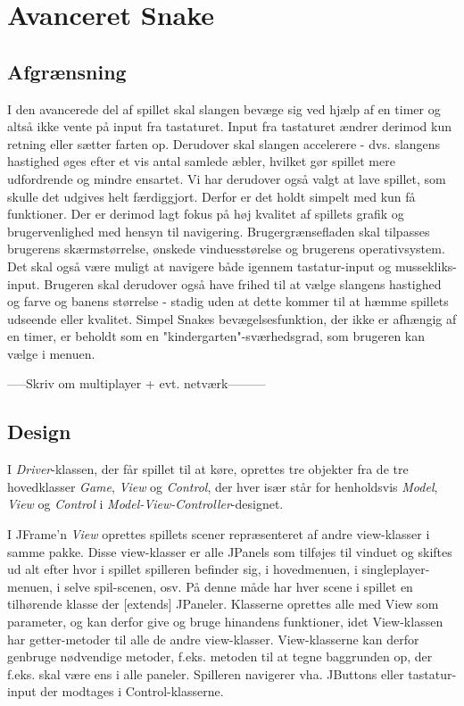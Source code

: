 \documentclass{report}
\begin{document}
\chapter{Avanceret Snake}
\section{Afgrænsning}
I den avancerede del af spillet skal slangen bevæge sig ved hjælp af en timer og altså ikke vente på input fra tastaturet. Input fra tastaturet ændrer derimod kun retning eller sætter farten op. Derudover skal slangen accelerere - dvs. slangens hastighed øges efter et vis antal samlede æbler, hvilket gør spillet mere udfordrende og mindre ensartet. Vi har derudover også valgt at lave spillet, som skulle det udgives helt færdiggjort. Derfor er det holdt simpelt med kun få funktioner. Der er derimod lagt fokus på høj kvalitet af spillets grafik og brugervenlighed med hensyn til navigering. Brugergrænsefladen skal tilpasses brugerens skærmstørrelse, ønskede vinduesstørelse og brugerens operativsystem. Det skal også være muligt at navigere både igennem tastatur-input og mussekliks-input. Brugeren skal derudover også have frihed til at vælge slangens hastighed og farve og banens størrelse - stadig uden at dette kommer til at hæmme spillets udseende eller kvalitet. Simpel Snakes bevægelsesfunktion, der ikke er afhængig af en timer, er beholdt som en "kindergarten"-sværhedsgrad, som brugeren kan vælge i menuen.

-----Skriv om multiplayer + evt. netværk---------


\section{Design}
I \textit{Driver}-klassen, der får spillet til at køre, oprettes tre objekter fra de tre hovedklasser \textit{Game}, \textit{View} og \textit{Control}, der hver især står for henholdsvis \textit{Model}, \textit{View} og \textit{Control} i \textit{Model-View-Controller}-designet.

I JFrame'n \textit{View} oprettes spillets scener repræsenteret af andre view-klasser i samme pakke. Disse view-klasser er alle JPanels som tilføjes til vinduet og skiftes ud alt efter hvor i spillet spilleren befinder sig, i hovedmenuen, i singleplayer-menuen, i selve spil-scenen, osv. På denne måde har hver scene i spillet en tilhørende klasse der [extends] JPaneler. Klasserne oprettes alle med View som parameter, og kan derfor give og bruge hinandens funktioner, idet View-klassen har getter-metoder til alle de andre view-klasser. View-klasserne kan derfor genbruge nødvendige metoder, f.eks. metoden til at tegne baggrunden op, der f.eks. skal være ens i alle paneler. Spilleren navigerer vha. JButtons eller tastatur-input der modtages i Control-klasserne.
\end{document}
